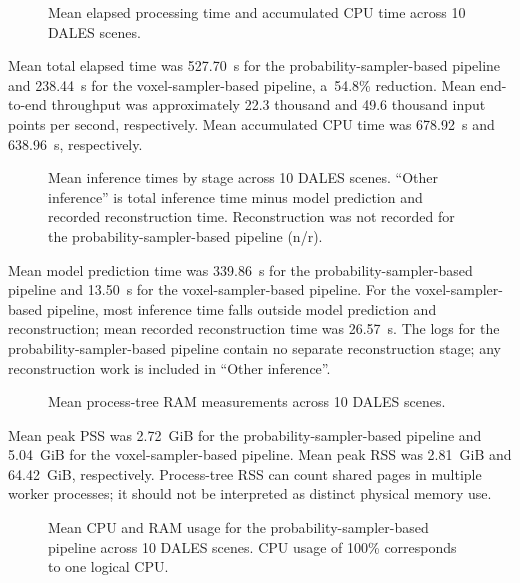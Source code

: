 \begin{figure}[H]
  \centering
  \caption{Mean elapsed processing time and accumulated CPU time across 10 DALES scenes.}
  \label{fig:processing_time}
\end{figure}

Mean total elapsed time was 527.70~s for the probability-sampler-based pipeline and 238.44~s for the voxel-sampler-based pipeline, a~54.8\% reduction. Mean end-to-end throughput was approximately 22.3 thousand and 49.6 thousand input points per second, respectively. Mean accumulated CPU time was 678.92~s and 638.96~s, respectively.

\begin{figure}[H]
  \centering
  \caption{Mean inference times by stage across 10 DALES scenes. ``Other inference'' is total inference time minus model prediction and recorded reconstruction time. Reconstruction was not recorded for the probability-sampler-based pipeline (n/r).}
  \label{fig:processing_stages}
\end{figure}

Mean model prediction time was 339.86~s for the probability-sampler-based pipeline and 13.50~s for the voxel-sampler-based pipeline. For the voxel-sampler-based pipeline, most inference time falls outside model prediction and reconstruction; mean recorded reconstruction time was 26.57~s. The logs for the probability-sampler-based pipeline contain no separate reconstruction stage; any reconstruction work is included in ``Other inference''.

\begin{figure}[H]
  \centering
  \caption{Mean process-tree RAM measurements across 10 DALES scenes.}
  \label{fig:memory_consumption}
\end{figure}

Mean peak PSS was 2.72~GiB for the probability-sampler-based pipeline and 5.04~GiB for the voxel-sampler-based pipeline. Mean peak RSS was 2.81~GiB and 64.42~GiB, respectively. Process-tree RSS can count shared pages in multiple worker processes; it should not be interpreted as distinct physical memory use.

\begin{figure}[H]
  \centering
  \caption{Mean CPU and RAM usage for the probability-sampler-based pipeline across 10 DALES scenes. CPU usage of 100\% corresponds to one logical CPU.}
  \label{fig:resource_timeline}
\end{figure}

